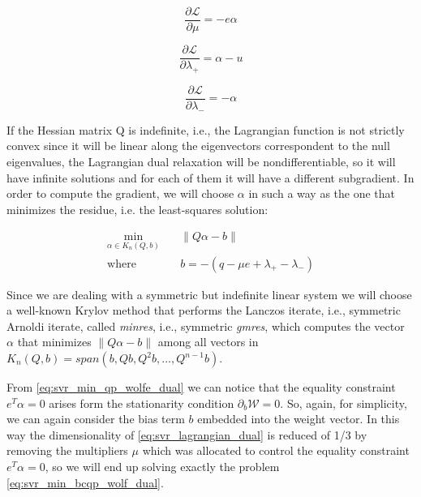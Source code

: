 \begin{equation} \label{eq:svr_lagrangian_der_mu}
	\frac{\partial \mathcal{L}}{\partial \mu}=-e \alpha
\end{equation}

\begin{equation} \label{eq:svr_lagrangian_der_lp}
	\frac{\partial \mathcal{L}}{\partial \lambda_+}=\alpha - u
\end{equation}

\begin{equation} \label{eq:svr_lagrangian_der_lm}
    \frac{\partial \mathcal{L}}{\partial \lambda_-}=-\alpha
\end{equation}

If the Hessian matrix Q is indefinite, i.e., the Lagrangian function is not strictly convex since it will be linear along the eigenvectors correspondent to the null eigenvalues, the Lagrangian dual relaxation will be nondifferentiable, so it will have infinite solutions and for each of them it will have a different subgradient. In order to compute the gradient, we will choose $\alpha$ in such a way as the one that minimizes the residue, i.e. the least-squares solution:

\begin{equation} \label{eq:svr_lagrangian_krylov_sol}
	\begin{aligned}
		\min_{\alpha \in K_n(Q, b)} \quad & \| Q \alpha - b \| \\ 
		\text{where} \quad & b = - (q - \mu e + \lambda_+ - \lambda_-)
	\end{aligned}
\end{equation}

Since we are dealing with a symmetric but indefinite linear system we will choose a well-known Krylov method that performs the Lanczos iterate, i.e., symmetric Arnoldi iterate, called \emph{minres}, i.e., symmetric \emph{gmres}, which computes the vector $\alpha$ that minimizes $\| Q \alpha - b \|$ among all vectors in $K_n(Q, b) = span(b, Qb, Q^2b, \dots, Q^{n-1}b)$.

\bigskip

From \ref{eq:svr_min_qp_wolfe_dual} we can notice that the equality constraint $e^T \alpha = 0$ arises form the stationarity condition $\partial_{{b}} \mathcal{W}=0$. So, again, for simplicity, we can again consider the bias term $b$ embedded into the weight vector. In this way the dimensionality of \ref{eq:svr_lagrangian_dual} is reduced of 1/3 by removing the multipliers $\mu$ which was allocated to control the equality constraint $e^T \alpha=0$, so we will end up solving exactly the problem \ref{eq:svr_min_bcqp_wolf_dual}.

